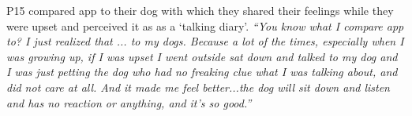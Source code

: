             P15 compared \acl{app} to their dog with which they shared their feelings while they were upset and perceived it as as a `talking diary'.
                \textit{``You know what I compare \acl{app} to? I just realized that ... to my dogs. Because a lot of the times, especially when I was growing up, if I was upset I went outside sat down and talked to my dog and I was just petting the dog who had no freaking clue what I was talking about, and did not care at all. And it made me feel better...the dog will sit down and listen and has no reaction or anything, and it's so good.''}
            
            
            
            
            
